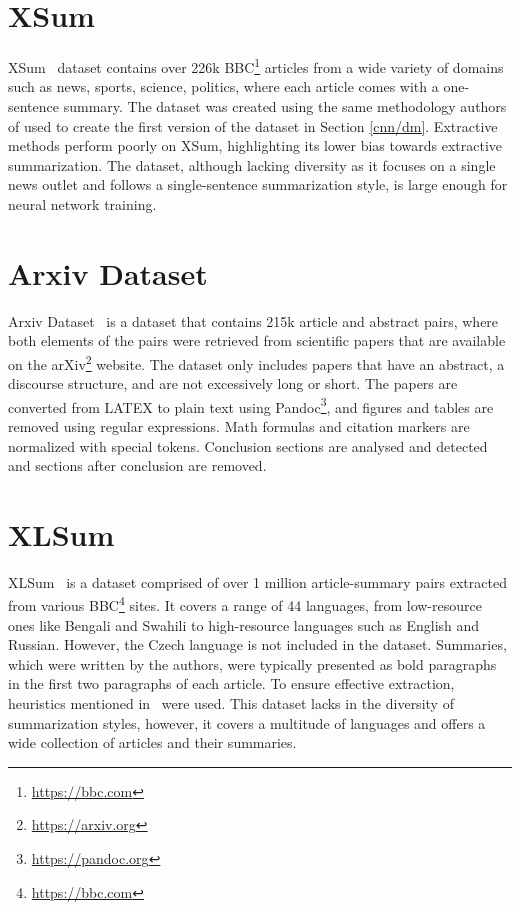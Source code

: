 \documentclass[english, ba, kiv, he, iso690numb, pdf, viewonly]{fasthesis}
\begin{document}
\section{XSum} \label{sec:xsum}
XSum~\cite{xsum-emnlp} dataset contains over 226k BBC\footnote{\url{https://bbc.com}} articles from a wide variety of domains such as news, sports, science, politics, where each article comes with a one-sentence summary. The dataset was created using the same methodology authors of \cite{HermannKGEKSB15} used to create the first version of the dataset in Section \ref{cnn/dm}. Extractive methods perform poorly on XSum, highlighting its lower bias towards extractive summarization. The dataset, although lacking diversity as it focuses on a single news outlet and follows a single-sentence summarization style, is large enough for neural network training.

\section{Arxiv Dataset}
Arxiv Dataset~\cite{cohan2018discourseaware} is a dataset that contains 215k article and abstract pairs, where both elements of the pairs were retrieved from scientific papers that are available on the arXiv\footnote{\url{https://arxiv.org}} website. The dataset only includes papers that have an abstract, a discourse structure, and are not excessively long or short. The papers are converted from LATEX to plain text using Pandoc\footnote{\url{https://pandoc.org}}, and figures and tables are removed using regular expressions. Math formulas and citation markers are normalized with special tokens. Conclusion sections are analysed and detected and sections after conclusion are removed.

\section{XLSum} \label{xlsum}
XLSum~\cite{hasan-etal-2021-xl} is a dataset comprised of over 1 million article-summary pairs extracted from various BBC\footnote{\url{https://bbc.com}} sites. It covers a range of 44 languages, from low-resource ones like Bengali and Swahili to high-resource languages such as English and Russian. However, the Czech language is not included in the dataset. Summaries, which were written by the authors, were typically presented as bold paragraphs in the first two paragraphs of each article. To ensure effective extraction, heuristics mentioned in~\cite{hasan-etal-2021-xl} were used. This dataset lacks in the diversity of summarization styles, however, it covers a multitude of languages and offers a wide collection of articles and their summaries.
\end{document}

